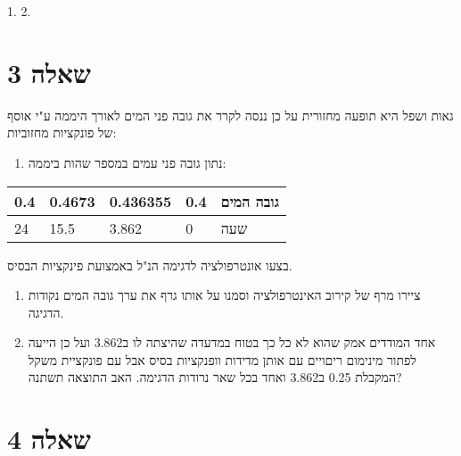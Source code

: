 \documentclass[10pt]{article}
\begin{document}
{\raggedleft
{\large 1.    \hspace{15pt}\hspace{15pt}2. }
}

{\raggedleft
\section{שאלה 3}
}

{\raggedleft
{\large גאות ושפל היא תופעה מחזורית על כן ננסה לקרר את גובה פני המים לאורך היממה
ע"י אוסף של פונקציות מחזוביות:}
}

\begin{enumerate}
	\item {\large נתון גובה פני עמים במספר שהות ביממה:}
\end{enumerate}

{\raggedright

\vspace{3pt} \noindent
\begin{tabular}{|p{74pt}|p{76pt}|p{78pt}|p{74pt}|p{75pt}|}
\hline
\parbox{74pt}{\raggedleft 
{\large 0.4}
} & \parbox{76pt}{\raggedleft 
{\large 0.4673}
} & \parbox{78pt}{\raggedleft 
{\large 0.436355}
} & \parbox{74pt}{\raggedleft 
{\large 0.4}
} & \parbox{75pt}{\raggedleft 
{\large גובה המים}
} \\
\hline
\parbox{74pt}{\raggedleft 
{\large 24}
} & \parbox{76pt}{\raggedleft 
{\large 15.5}
} & \parbox{78pt}{\raggedleft 
{\large 3.862}
} & \parbox{74pt}{\raggedleft 
{\large 0}
} & \parbox{75pt}{\raggedleft 
{\large שעה}
} \\
\hline
\end{tabular}
\vspace{2pt}

}

{\raggedleft
{\large בצעו אונטרפולציה לדגימה הנ"ל באמצועת פינקציות הבסיס.}
}

\begin{enumerate}
	\item {\large ציירו מרף של קירוב האינטרפולציה וסמנו על אותו גרף את ערך גובה המים
נקודות הדגיגה.}
	\item {\large אחד המודדים אמק שהוא לא כל כך בטוח במדעדה שהיצתה לו ב3.862 ועל כן הייעה
לפתור מינימום ריםויים עם אותן מדידות וופנקציות בסיס אבל עם פונקציית משקל המקבלת
0.25 ב3.862 ואחד בכל שאר נרודות הדגימה. האב התוצאה תשתנה?}
\end{enumerate}
\pagebreak{}


{\raggedleft
\section{שאלה 4}
}
\end{document}
